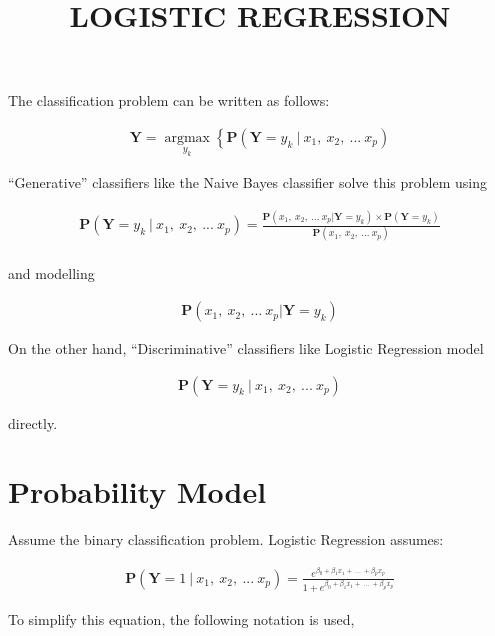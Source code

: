 \documentclass[11pt, a4paper]{article}
\begin{document}
\title{LOGISTIC REGRESSION}
\date{}
\maketitle

The classification problem can be written as follows:

\begin{align*}
	\mathbf{Y} = \operatorname*{argmax}_{y_k}\left\{    
	\mathbf{P}(\mathbf{Y}=y_k\ |\ x_1,\ x_2,\ ...\ x_p) 
	\right.                                             
\end{align*}

``Generative'' classifiers like the Naive Bayes classifier solve this problem using

\begin{align*}
	\mathbf{P}(\mathbf{Y}=y_k\ |\ x_1,\ x_2,\ ...\ x_p) = \frac{\mathbf{P}(x_1,\ x_2,\ ...\ x_p|\mathbf{Y}=y_k) \times \mathbf{P}(\mathbf{Y}=y_k)}{\mathbf{P}(x_1,\ x_2,\ ...\ x_p)} \\
\end{align*}

and modelling

\begin{align*}
	\mathbf{P}(x_1,\ x_2,\ ...\ x_p|\mathbf{Y}=y_k) 
\end{align*}

On the other hand, ``Discriminative'' classifiers like Logistic Regression model

\begin{align*}
	\mathbf{P}(\mathbf{Y}=y_k\ |\ x_1,\ x_2,\ ...\ x_p) 
\end{align*}

directly. 

\section{Probability Model}

Assume the binary classification problem. Logistic Regression assumes:

\begin{align*}
	\mathbf{P}(\mathbf{Y}=1\ |\ x_1,\ x_2,\ ...\ x_p) = \frac{e^{\beta_0 + \beta_1 x_1 +\  ...\  + \beta_p x_p}}{1 + e^{\beta_0 + \beta_1 x_1 +\  ...\  + \beta_p x_p}} 
\end{align*}

To simplify this equation, the following notation is used,
\end{document}

